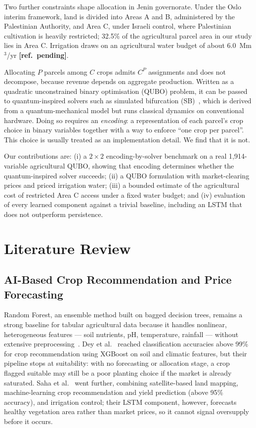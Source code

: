 \documentclass[conference,a4paper]{IEEEtran}
\newcommand{\refpending}{\textbf{[ref.\ pending]}}
\begin{document}
Two further constraints shape allocation in Jenin governorate. Under the Oslo
interim framework, land is divided into Areas A and B, administered by the
Palestinian Authority, and Area C, under Israeli control, where Palestinian
cultivation is heavily restricted; 32.5\% of the agricultural parcel area in
our study lies in Area C. Irrigation draws on an agricultural water budget of
about 6.0~Mm$^3$/yr \refpending.

Allocating $P$ parcels among $C$ crops admits $C^P$ assignments and does not
decompose, because revenue depends on aggregate production. Written as a
quadratic unconstrained binary optimisation (QUBO) problem, it can be passed to
quantum-inspired solvers such as simulated bifurcation (SB)~\cite{goto2021},
which is derived from a quantum-mechanical model but runs classical dynamics
on conventional hardware. Doing so requires an \emph{encoding}: a
representation of each parcel's crop choice in binary variables together with
a way to enforce ``one crop per parcel''. This choice is usually treated as an
implementation detail. We find that it is not.

Our contributions are: (i) a $2\times2$ encoding-by-solver benchmark on a real
1{,}914-variable agricultural QUBO, showing that encoding determines whether
the quantum-inspired solver succeeds; (ii) a QUBO formulation with
market-clearing prices and priced irrigation water; (iii) a bounded estimate of
the agricultural cost of restricted Area C access under a fixed water budget;
and (iv) evaluation of every learned component against a trivial baseline,
including an LSTM that does not outperform persistence.

\section{Literature Review}

\subsection{AI-Based Crop Recommendation and Price Forecasting}

Random Forest, an ensemble method built on bagged decision trees, remains a
strong baseline for tabular agricultural data because it handles nonlinear,
heterogeneous features --- soil nutrients, pH, temperature, rainfall ---
without extensive preprocessing~\cite{breiman2001}. Dey et
al.~\cite{dey2024} reached classification accuracies above 99\% for crop
recommendation using XGBoost on soil and climatic features, but their pipeline
stops at suitability: with no forecasting or allocation stage, a crop flagged
suitable may still be a poor planting choice if the market is already
saturated. Saha et al.~\cite{saha2025} went further, combining satellite-based
land mapping, machine-learning crop recommendation and yield prediction (above
95\% accuracy), and irrigation control; their LSTM component, however,
forecasts healthy vegetation area rather than market prices, so it cannot
signal oversupply before it occurs.
\end{document}
